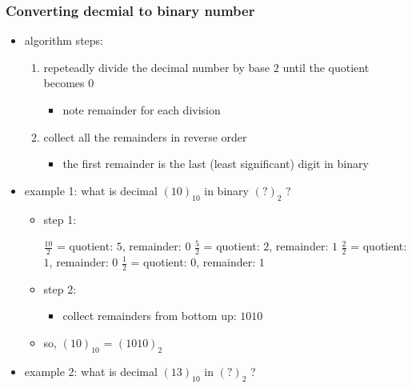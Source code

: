 \documentclass[11pt]{article}
\providecommand{\tightlist}{%
      \setlength{\itemsep}{0pt}\setlength{\parskip}{0pt}}
\begin{document}
\hypertarget{converting-decmial-to-binary-number}{%
\subsubsection{Converting decmial to binary
number}\label{converting-decmial-to-binary-number}}

\begin{itemize}
\tightlist
\item
  algorithm steps:

  \begin{enumerate}
  \def\labelenumi{\arabic{enumi}.}
  \tightlist
  \item
    repeteadly divide the decimal number by base \(2\) until the
    quotient becomes \(0\)

    \begin{itemize}
    \tightlist
    \item
      note remainder for each division
    \end{itemize}
  \item
    collect all the remainders in reverse order

    \begin{itemize}
    \tightlist
    \item
      the first remainder is the last (least significant) digit in
      binary
    \end{itemize}
  \end{enumerate}
\item
  example 1: what is decimal \((10)_{10}\) in binary \((?)_2\) ?

  \begin{itemize}
  \item
    step 1:

    \(\frac{10}{2}\) = quotient: \(5\), remainder: \(0\) \(\frac{5}{2}\)
    = quotient: \(2\), remainder: \(1\) \(\frac{2}{2}\) = quotient:
    \(1\), remainder: \(0\) \(\frac{1}{2}\) = quotient: \(0\),
    remainder: \(1\)
  \item
    step 2:

    \begin{itemize}
    \tightlist
    \item
      collect remainders from bottom up: \(1010\)
    \end{itemize}
  \item
    so, \((10)_{10}\) = \((1010)_2\)
  \end{itemize}
\item
  example 2: what is decimal \((13)_{10}\) in \((?)_2\) ?


\end{itemize}
\end{document}
